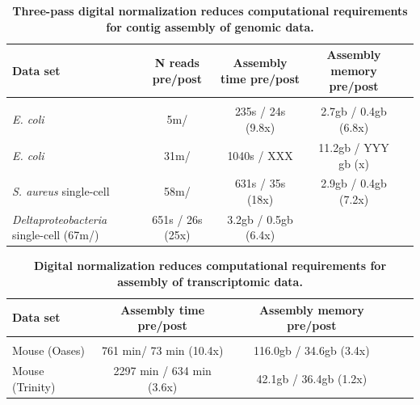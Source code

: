 \documentclass[10pt]{article}
\begin{document}
\begin{table}[!ht]
\caption{
\bf{Three-pass digital normalization reduces computational requirements for contig assembly of genomic data.}}
\begin{tabular}{|l|c|c|c|c|}

Data set & N reads pre/post & Assembly time pre/post & Assembly memory pre/post \\
\hline \\
{\em E. coli} & 5m/ & 235s / 24s (9.8x) & 2.7gb / 0.4gb (6.8x) \\
{\em E. coli} & 31m/ & 1040s / XXX & 11.2gb / YYY gb (x) \\ 
{\em S. aureus} single-cell & 58m/ & 631s / 35s (18x) & 2.9gb / 0.4gb (7.2x) \\
{\em Deltaproteobacteria} single-cell (67m/) & 651s / 26s (25x) & 3.2gb / 0.5gb (6.4x) \\

\end{tabular}
\begin{flushleft}
\end{flushleft}
\label{tab:dngenome}
\end{table}


\begin{table}[!ht]
\caption{
\bf{Digital normalization reduces computational requirements for assembly of transcriptomic data.}}

\begin{tabular}{|l|c|c|c|c|}

Data set & Assembly time pre/post & Assembly memory pre/post \\
\hline \\
Mouse (Oases) & 761 min/ 73 min (10.4x) & 116.0gb / 34.6gb (3.4x) \\
Mouse (Trinity) & 2297 min / 634 min (3.6x) & 42.1gb / 36.4gb (1.2x) \\

\end{tabular}

\begin{flushleft}
\end{flushleft}
\label{tab:dntrans}
\end{table}
\end{document}
